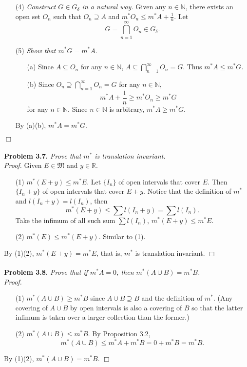 \documentclass{article}
\begin{document}
\begin{enumerate}
\item[(4)]
\emph{Construct $G \in G_{\delta}$ in a natural way.}
Given any $n \in \mathbb{N}$, there exists an open set $O_n$
such that $O_n \supseteq A$ and $m^{*}O_n \leq m^{*}A + \frac{1}{n}$.
Let
$$G = \bigcap_{n=1}^{\infty} O_n \in G_{\delta}.$$
\item[(5)]
\emph{Show that $m^{*}G = m^{*}A$.}
  \begin{enumerate}
  \item[(a)]
  Since $A \subseteq O_n$ for any $n \in \mathbb{N}$,
  $A \subseteq \bigcap_{n=1}^{\infty} O_n = G$.
  Thus $m^{*}A \leq m^{*}G$.
  \item[(b)]
  Since $O_n \supseteq \bigcap_{n=1}^{\infty} O_n = G$ for any $n \in \mathbb{N}$,
  $$m^{*}A + \frac{1}{n} \geq m^{*}O_n \geq m^{*}G$$
  for any $n \in \mathbb{N}$.
  Since $n \in \mathbb{N}$ is arbitrary, $m^{*}A \geq m^{*}G$.
  \end{enumerate}
By (a)(b), $m^{*}A = m^{*}G$.
\end{enumerate}
$\Box$ \\\\



\textbf{Problem 3.7.}
\emph{Prove that $m^{*}$ is translation invariant.} \\

\emph{Proof.}
Given $E \in \mathfrak{M}$ and $y \in \mathbb{R}$.
\begin{enumerate}
\item[(1)]
$m^{*}(E + y) \leq m^{*}E$.
Let $\{ I_n \}$ of open intervals that cover $E$.
Then $\{ I_n+y \}$ of open intervals that cover $E+y$.
Notice that the definition of $m^{*}$ and $l(I_n+y) = l(I_n)$, then
$$m^{*}(E + y) \leq \sum l(I_n+y) = \sum l(I_n).$$
Take the infimum of all such sum $\sum l(I_n)$,
$m^{*}(E + y) \leq m^{*}E$.
\item[(2)]
$m^{*}(E) \leq m^{*}(E + y)$.
Similar to (1).
\end{enumerate}
By (1)(2), $m^{*}(E + y) = m^{*}E$, that is, $m^{*}$ is translation invariant.
$\Box$ \\\\



\textbf{Problem 3.8.}
\emph{Prove that if $m^{*}A = 0$, then $m^{*}(A \cup B) = m^{*}B$.} \\

\emph{Proof.}
\begin{enumerate}
\item[(1)]
$m^{*}(A \cup B) \geq m^{*}B$ since $A \cup B \supseteq B$
and the definition of $m^{*}$.
(Any covering of $A \cup B$ by open intervals is also a covering of $B$
so that the latter infimum is taken over a larger collection than the former.)
\item[(2)]
$m^{*}(A \cup B) \leq m^{*}B$.
By Proposition 3.2,
$$m^{*}(A \cup B) \leq m^{*}A + m^{*}B = 0 + m^{*}B = m^{*}B.$$
\end{enumerate}
By (1)(2), $m^{*}(A \cup B) = m^{*}B$.
$\Box$ \\\\
\end{document}
